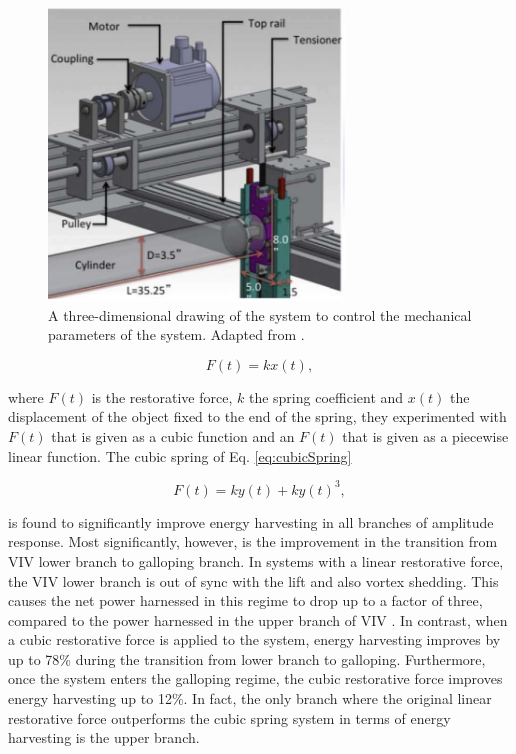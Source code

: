 \documentclass[oneside]{utmthesis}
\begin{document}
\begin{figure}[!h]
  \centering
  \hspace{1cm} \includegraphics[width=0.7\textwidth]{figs/vckSystemModel}
  \caption{A three-dimensional drawing of the system to control the mechanical parameters of the system. Adapted from \citet{Ma2018}.}
  \label{fig:vckSystemModel}
\end{figure}


\begin{equation}
  F(t) = k x(t),
  \label{eq:linearSpring}
\end{equation}

\noindent where $F(t)$ is the restorative force, $k$ the spring coefficient and $x(t)$ the displacement of the object fixed to the end of the spring, they experimented with $F(t)$ that is given as a cubic function and an $F(t)$ that is given as a piecewise linear function. The cubic spring of Eq. \ref{eq:cubicSpring}

\begin{equation}
  F(t) = k y(t) + k y(t)^{3},
  \label{eq:cubicSpring}
\end{equation}

\noindent is found to significantly improve energy harvesting in all branches of amplitude response. Most significantly, however, is the improvement in the transition from VIV lower branch to galloping branch. In systems with a linear restorative force, the VIV lower branch is out of sync with the lift and also vortex shedding. This causes the net power harnessed in this regime to drop up to a factor of three, compared to the power harnessed in the upper branch of VIV \citep{Sun2018,Ma2018}. In contrast, when a cubic restorative force is applied to the system, energy harvesting improves by up to 78\% during the transition from lower branch to galloping. Furthermore, once the system enters the galloping regime, the cubic restorative force improves energy harvesting up to 12\%. In fact, the only branch where the original linear restorative force outperforms the cubic spring system in terms of energy harvesting is the upper branch.
\end{document}
